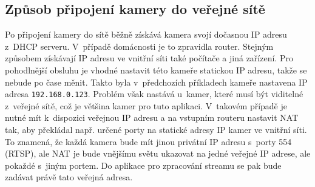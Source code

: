 \subsection{Způsob připojení kamery do veřejné sítě}
Po připojení kamery do sítě běžně získává kamera svojí dočasnou IP adresu z~DHCP serveru. V~případě domácnosti je to zpravidla router. Stejným způsobem získávají IP adresu ve vnitřní síti také počítače a jiná zařízení. Pro pohodlnější obsluhu je vhodné nastavit této kameře statickou IP adresu, takže se nebude po čase měnit. Takto byla v~předchozích příkladech kameře nastavena IP adresa \texttt{192.168.0.123}. Problém však nastává u~kamer, které musí být viditelné z~veřejné sítě, což je většina kamer pro tuto aplikaci. V~takovém případě je nutné mít k~dispozici veřejnou IP adresu a na vstupním routeru nastavit NAT tak, aby překládal např. určené porty na statické adresy IP kamer ve vnitřní síti. To znamená, že každá kamera bude mít jinou privátní IP adresu s~porty 554 (RTSP), ale NAT je bude vnějšímu světu ukazovat na jedné veřejné IP adrese, ale pokaždé s~jiným portem. Do aplikace pro zpracování streamu se pak bude zadávat právě tato veřejná adresa.